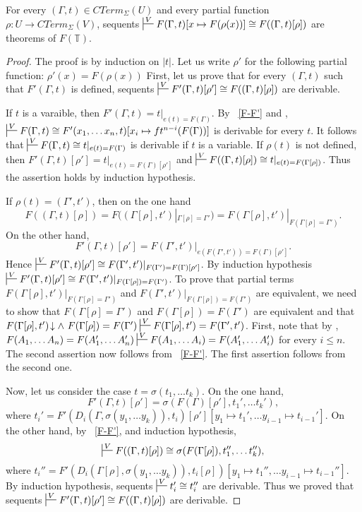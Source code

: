 \documentclass[reqno]{amsart}
\theoremstyle{definition}
\theoremstyle{remark}
\numberwithin{figure}{section}
\begin{document}
\begin{prop}[F-subst]
For every $(\Gamma,t) \in CTerm_\Sigma(U)$ and every partial function $\rho : U \to CTerm_\Sigma(V)$,
    sequents $\sststile{}{V} F(\Gamma,t)[x \mapsto F(\rho(x))] \cong F((\Gamma,t)[\rho])$ are theorems of $F(\mathbb{T})$.
\end{prop}
\begin{proof}
The proof is by induction on $|t|$.
Let us write $\rho'$ for the following partial function: $\rho'(x) = F(\rho(x))$
First, let us prove that for every $(\Gamma,t)$ such that $F'(\Gamma,t)$ is defined,
    sequents $\sststile{}{V} F'(\Gamma,t)[\rho'] \cong F((\Gamma,t)[\rho])$ are derivable.

If $t$ is a varaible, then $F'(\Gamma,t) = t|_{e(t) = F(\Gamma)}$.
By ~\eqref{F-F'} and , $\sststile{}{V} F(\Gamma,t) \cong F'(x_1, \ldots x_n, t)[x_i \mapsto ft^{n-i}(F(\Gamma))]$ is derivable for every $t$.
It follows that $\sststile{}{V} F(\Gamma,t) \cong t|_{e(t) = F(\Gamma)}$ is derivable if $t$ is a variable.
If $\rho(t)$ is not defined, then $F'(\Gamma,t)[\rho'] = t|_{e(t) = F(\Gamma)[\rho']}$ and $\sststile{}{V} F((\Gamma,t)[\rho]) \cong t|_{e(t) = F(\Gamma[\rho])}$.
Thus the assertion holds by induction hypothesis.

If $\rho(t) = (\Gamma',t')$, then on the one hand
\[ F((\Gamma,t)[\rho]) = F((\Gamma[\rho],t')|_{\Gamma[\rho] = \Gamma'}) = F(\Gamma[\rho],t')|_{F(\Gamma[\rho] = \Gamma')}. \]
On the other hand,
\[ F'(\Gamma,t)[\rho'] = F(\Gamma',t')|_{e(F(\Gamma',t')) = F(\Gamma)[\rho']}. \]
Hence $\sststile{}{V} F'(\Gamma,t)[\rho'] \cong F(\Gamma',t')|_{F(\Gamma') = F(\Gamma)[\rho']}$.
By induction hypothesis $\sststile{}{V} F'(\Gamma,t)[\rho'] \cong F(\Gamma',t')|_{F(\Gamma[\rho]) = F(\Gamma')}$.
To prove that partial terms $F(\Gamma[\rho],t')|_{F(\Gamma[\rho] = \Gamma')}$ and $F(\Gamma',t')|_{F(\Gamma[\rho]) = F(\Gamma')}$ are equivalent,
    we need to show that $F(\Gamma[\rho] = \Gamma')$ and $F(\Gamma[\rho]) = F(\Gamma')$ are equivalent and that
    $F(\Gamma[\rho],t')\!\downarrow \land\ F(\Gamma[\rho]) = F(\Gamma') \sststile{}{V} F(\Gamma[\rho],t') = F(\Gamma',t')$.
First, note that by , $F(A_1, \ldots A_n) = F(A_1', \ldots A_n') \allowbreak \sststile{}{V} F(A_1, \ldots A_i) = F(A_1', \ldots A_i')$ for every $i \leq n$.
The second assertion now follows from ~\eqref{F-F'}.
The first assertion follows from the second one.

Now, let us consider the case $t = \sigma(t_1, \ldots t_k)$.
On the one hand,
\[ F'(\Gamma,t)[\rho'] = \sigma(F(\Gamma)[\rho'], t_1', \ldots t_k'), \]
    where $t_i' = F'(D_i(\Gamma, \sigma(y_1, \ldots y_k)), t_i)[\rho'][y_1 \mapsto t_1', \ldots y_{i-1} \mapsto t_{i-1}']$.
On the other hand, by ~\eqref{F-F'},  and induction hypothesis,
\[ \sststile{}{V} F((\Gamma,t)[\rho]) \cong \sigma(F(\Gamma[\rho]), t_1'', \ldots t_k''), \]
    where $t_i'' = F'(D_i(\Gamma[\rho], \sigma(y_1, \ldots y_k)), t_i[\rho])[y_1 \mapsto t_1'', \ldots y_{i-1} \mapsto t_{i-1}'']$.
By induction hypothesis, sequents $\sststile{}{V} t_i' \cong t_i''$ are derivable.
Thus we proved that sequents $\sststile{}{V} F'(\Gamma,t)[\rho'] \cong F((\Gamma,t)[\rho])$ are derivable.


\end{proof}
\end{document}
